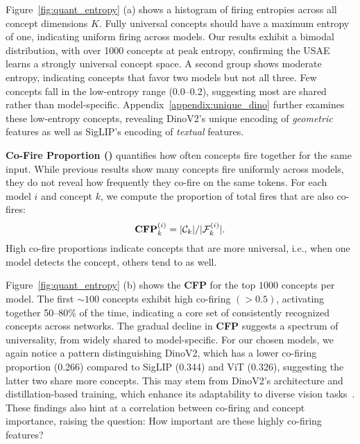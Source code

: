 Figure~\ref{fig:quant_entropy} (a) shows a histogram of firing entropies across all concept dimensions $K$. Fully universal concepts should have a maximum entropy of one, indicating uniform firing across models. 
Our results exhibit a bimodal distribution, with over 1000 concepts at peak entropy, confirming the USAE learns a strongly universal concept space.
A second group shows moderate entropy, indicating concepts that favor two models but not all three.
Few concepts fall in the low-entropy range (0.0–0.2), suggesting most are shared rather than model-specific. Appendix~\ref{appendix:unique_dino} further examines these low-entropy concepts, revealing DinoV2’s unique encoding of \textit{geometric} features as well as SigLIP's encoding of \textit{textual} features.

\noindent \textbf{Co-Fire Proportion (\CFP)} quantifies how often concepts fire together for the same input. While previous results show many concepts fire uniformly across models, they do not reveal how frequently they co-fire on the same tokens. For each model $i$ and concept $k$, we compute the proportion of total fires that are also co-fires:
\begin{equation}
\text{\textbf{CFP}}^{(i)}_k = |\mathcal{C}_k|/|\mathcal{F}^{(i)}_k|.
\end{equation}
High co-fire proportions indicate concepts that are more universal, i.e., when one model detects the concept, others tend to as well. 


Figure~\ref{fig:quant_entropy} (b) shows the \textbf{CFP} for the top $1000$ concepts per model. The first ${\sim}100$ concepts exhibit high co-firing $(>0.5)$, activating together 50–80\% of the time, indicating a core set of consistently recognized concepts across networks. The gradual decline in \textbf{CFP} suggests a spectrum of universality, from widely shared to model-specific. For our chosen models, we again notice a pattern distinguishing DinoV2, which has a lower co-firing proportion (0.266) compared to SigLIP (0.344) and ViT (0.326), suggesting the latter two share more concepts. This may stem from DinoV2’s architecture and distillation-based training, which enhance its adaptability to diverse vision tasks~\cite{amir2021deep}. These findings also hint at a correlation between co-firing and concept importance, raising the question: How important are these highly co-firing features?


